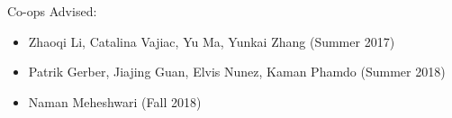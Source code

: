 \vspace{-0.3in}

Co-ops Advised:
\begin{itemize}
 \itemsep 0pt
	\item Zhaoqi Li, Catalina Vajiac, Yu Ma, Yunkai Zhang (Summer 2017)
	\item Patrik Gerber, Jiajing Guan, Elvis Nunez, Kaman Phamdo (Summer 2018)
	\item Naman Meheshwari (Fall 2018)
\end{itemize}


